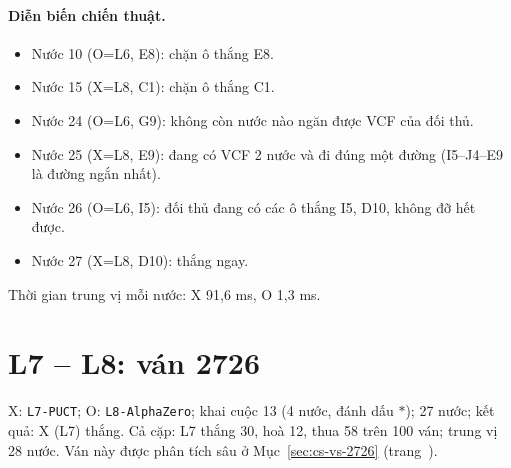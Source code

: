 \paragraph{Diễn biến chiến thuật.}
\begin{itemize}\footnotesize\linespread{1.1}\selectfont
\setlength{\itemsep}{0pt}
  \item Nước 10 (O=L6, E8): chặn ô thắng E8.
  \item Nước 15 (X=L8, C1): chặn ô thắng C1.
  \item Nước 24 (O=L6, G9): không còn nước nào ngăn được VCF của đối thủ.
  \item Nước 25 (X=L8, E9): đang có VCF 2 nước và đi đúng một đường (I5--J4--E9 là đường ngắn nhất).
  \item Nước 26 (O=L6, I5): đối thủ đang có các ô thắng I5, D10, không đỡ hết được.
  \item Nước 27 (X=L8, D10): thắng ngay.
\end{itemize}
Thời gian trung vị mỗi nước: X 91,6 ms, O 1,3 ms.
\clearpage

\section{L7 -- L8: ván 2726}
\label{sec:cs-van-28}
X: \texttt{L7-PUCT}; O: \texttt{L8-AlphaZero}; khai cuộc 13 (4 nước, đánh dấu $\ast$); 27 nước; kết quả: X (L7) thắng. Cả cặp: L7 thắng 30, hoà 12, thua 58 trên 100 ván; trung vị 28 nước.
Ván này được phân tích sâu ở Mục~\ref{sec:cs-vs-2726} (trang~\pageref{sec:cs-vs-2726}).
